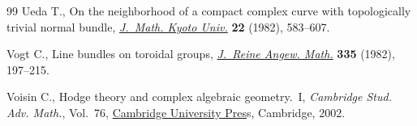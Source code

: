 \begin{thebibliography}{99}
Ueda T., On the neighborhood of a compact complex curve with topologically
 trivial normal bundle,
 \href{https://doi.org/10.1215/kjm/1250521670}{\textit{J.~Math. Kyoto Univ.}}
 \textbf{22} (1982), 583--607.

Vogt C., Line bundles on toroidal groups,
 \href{https://doi.org/10.1515/crll.1982.335.197}{\textit{J.~Reine Angew.
 Math.}} \textbf{335} (1982), 197--215.

Voisin C., Hodge theory and complex algebraic geometry.~{I}, \textit{Cambridge
 Stud. Adv. Math.}, Vol.~76,
 \href{https://doi.org/10.1017/CBO9780511615344}{Cambridge University Pres}s,
 Cambridge, 2002.

\end{thebibliography}
